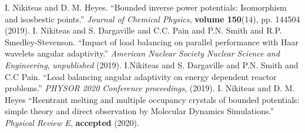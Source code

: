 \begingroup
\renewcommand{\section}[2]{}%
\begin{thebibliography}{}%
    I. Nikiteas and D. M. Heyes.
    ``Bounded inverse power potentials: Isomorphism and isosbestic points.''\newline
    \textit{Journal of Chemical Physics}, \textbf{volume 150}(14), pp. 144504 (2019).
    \newline \newline
    I. Nikiteas and S. Dargaville and C.C. Pain and P.N. Smith and R.P. Smedley-Stevenson.
    ``Impact of load balancing on parallel performance with Haar wavelets angular adaptivity.''
    \textit{American Nuclear Society Nuclear Science and Engineering}, \textit{unpublished} (2019).
    \newline \newline
    I.Nikiteas and S. Dargaville and P.N. Smith and C.C Pain.
    ``Load balancing angular adaptivity on energy dependent reactor problems.''
    \textit{PHYSOR 2020 Conference proceedings}, (2019).
    \newline \newline
    I. Nikiteas and D. M. Heyes
    ``Reentrant melting and multiple occupancy crystals of bounded
    potentials: simple theory and direct observation by Molecular
    Dynamics Simulations.'' \textit{Physical Review E}, \textbf{accepted} (2020).
\end{thebibliography}
%
%

